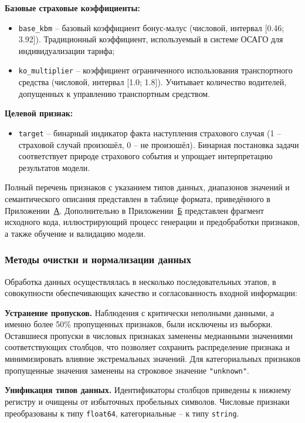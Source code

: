 \textbf{Базовые страховые коэффициенты:}
\begin{itemize}
    \item \texttt{base\_kbm} – базовый коэффициент бонус-малус (числовой, интервал [0.46; 3.92]). Традиционный коэффициент, используемый в системе ОСАГО для индивидуализации тарифа;
    \item \texttt{ko\_multiplier} – коэффициент ограниченного использования транспортного средства (числовой, интервал [1.0; 1.8]). Учитывает количество водителей, допущенных к управлению транспортным средством.
\end{itemize}

\textbf{Целевой признак:}
\begin{itemize}
    \item \texttt{target} – бинарный индикатор факта наступления страхового случая (1 – страховой случай произошёл, 0 – не произошёл). Бинарная постановка задачи соответствует природе страхового события и упрощает интерпретацию результатов модели.
\end{itemize}

Полный перечень признаков с указанием типов данных, диапазонов значений и семантического описания представлен в таблице формата, приведённого в Приложении~\hyperref[app:features]{А}. Дополнительно в Приложении~\hyperref[app:feature_code]{Б} представлен фрагмент исходного кода, иллюстрирующий процесс генерации и предобработки признаков, а также обучение и валидацию модели.

\subsubsection{Методы очистки и нормализации данных}

Обработка данных осуществлялась в несколько последовательных этапов, в совокупности обеспечивающих качество и согласованность входной информации:

\textbf{Устранение пропусков.} Наблюдения с критически неполными данными, а именно более 50\% пропущенных признаков, были исключены из выборки. Оставшиеся пропуски в числовых признаках заменены медианными значениями соответствующих столбцов, что позволяет сохранить распределение признака и минимизировать влияние экстремальных значений. Для категориальных признаков пропущенные значения заменены на строковое значение \texttt{"unknown"}.

\textbf{Унификация типов данных.} Идентификаторы столбцов приведены к нижнему регистру и очищены от избыточных пробельных символов. Числовые признаки преобразованы к типу \texttt{float64}, категориальные – к типу \texttt{string}.

